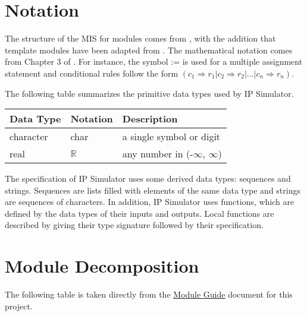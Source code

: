 \documentclass[12pt, titlepage]{article}
\begin{document}
\section{Notation}

The structure of the MIS for modules comes from \citet{HoffmanAndStrooper1995},
with the addition that template modules have been adapted from
\cite{GhezziEtAl2003}.  The mathematical notation comes from Chapter 3 of
\citet{HoffmanAndStrooper1995}.  For instance, the symbol := is used for a
multiple assignment statement and conditional rules follow the form $(c_1
\Rightarrow r_1 | c_2 \Rightarrow r_2 | ... | c_n \Rightarrow r_n )$.

The following table summarizes the primitive data types used by IP Simulator. 

\begin{center}
\renewcommand{\arraystretch}{1.2}
\noindent 
\begin{tabular}{l l p{7.5cm}} 
\toprule 
\textbf{Data Type} & \textbf{Notation} & \textbf{Description}\\ 
\midrule
character & char & a single symbol or digit\\
real & $\mathbb{R}$ & any number in (-$\infty$, $\infty$)\\
\bottomrule
\end{tabular} 
\end{center}

\noindent
The specification of IP Simulator uses some derived data types: sequences and strings. Sequences are lists filled with elements of the same data type and strings are sequences of characters. In addition, IP Simulator uses functions, which are defined by the data types of their inputs and outputs. Local functions are described by giving their type signature followed by their specification.

\section{Module Decomposition}

The following table is taken directly from the \href{https://github.com/MinMah23/CAS741-Project/blob/main/docs/Design/SoftArchitecture/MG.pdf}{Module Guide} document for this project.
\end{document}
